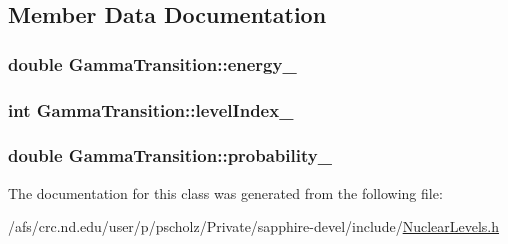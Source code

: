 \subsection{Member Data Documentation}
\hypertarget{classGammaTransition_a548b2d968c5866e6a2ed47755ade3ff4}{
\subsubsection[{energy\-\_\-}]{\setlength{\rightskip}{0pt plus 5cm}double Gamma\-Transition\-::energy\-\_\-}}\label{classGammaTransition_a548b2d968c5866e6a2ed47755ade3ff4}
\hypertarget{classGammaTransition_a021b75eb240faa0a828666d944dd133f}{
\subsubsection[{level\-Index\-\_\-}]{\setlength{\rightskip}{0pt plus 5cm}int Gamma\-Transition\-::level\-Index\-\_\-}}\label{classGammaTransition_a021b75eb240faa0a828666d944dd133f}
\hypertarget{classGammaTransition_a056ef79f20cab353c9b577c720cdf8e4}{
\subsubsection[{probability\-\_\-}]{\setlength{\rightskip}{0pt plus 5cm}double Gamma\-Transition\-::probability\-\_\-}}\label{classGammaTransition_a056ef79f20cab353c9b577c720cdf8e4}


The documentation for this class was generated from the following file\-:\begin{DoxyCompactItemize}
\item 
/afs/crc.\-nd.\-edu/user/p/pscholz/\-Private/sapphire-\/devel/include/\hyperlink{NuclearLevels_8h}{Nuclear\-Levels.\-h}\end{DoxyCompactItemize}
